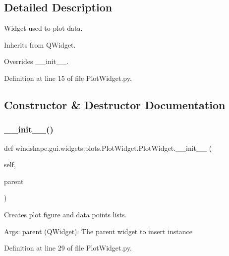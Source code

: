\subsection{Detailed Description}
\begin{DoxyVerb}Widget used to plot data.

Inherits from QWidget.

Overrides __init__.
\end{DoxyVerb}
 

Definition at line 15 of file Plot\+Widget.\+py.



\subsection{Constructor \& Destructor Documentation}
\mbox{\label{classwindshape_1_1gui_1_1widgets_1_1plots_1_1_plot_widget_1_1_plot_widget_a5598749959415954a3dd71a2fa42fb47}} 
\subsubsection{\texorpdfstring{\+\_\+\+\_\+init\+\_\+\+\_\+()}{\_\_init\_\_()}}
{\footnotesize\ttfamily def windshape.\+gui.\+widgets.\+plots.\+Plot\+Widget.\+Plot\+Widget.\+\_\+\+\_\+init\+\_\+\+\_\+ (\begin{DoxyParamCaption}\item[{}]{self,  }\item[{}]{parent }\end{DoxyParamCaption})}

\begin{DoxyVerb}Creates plot figure and data points lists.

Args:
    parent (QWidget): The parent widget to insert instance
\end{DoxyVerb}
 

Definition at line 29 of file Plot\+Widget.\+py.



